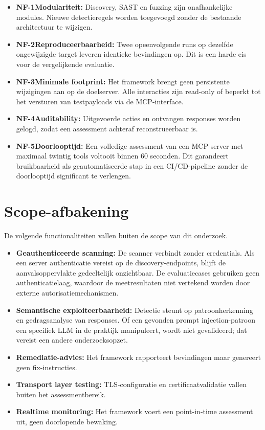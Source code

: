 \begin{itemize}
    \item \textbf{NF-1Modulariteit:} Discovery, SAST en fuzzing zijn onafhankelijke modules. Nieuwe detectieregels worden toegevoegd zonder de bestaande architectuur te wijzigen.
    \item \textbf{NF-2Reproduceerbaarheid:} Twee opeenvolgende runs op dezelfde ongewijzigde target leveren identieke bevindingen op. Dit is een harde eis voor de vergelijkende evaluatie.
    \item \textbf{NF-3Minimale footprint:} Het framework brengt geen persistente wijzigingen aan op de doelserver. Alle interacties zijn read-only of beperkt tot het versturen van testpayloads via de MCP-interface.
    \item \textbf{NF-4Auditability:} Uitgevoerde acties en ontvangen responses worden gelogd, zodat een assessment achteraf reconstrueerbaar is.
    \item \textbf{NF-5Doorlooptijd:} Een volledige assessment van een MCP-server met maximaal twintig tools voltooit binnen 60 seconden. Dit garandeert bruikbaarheid als geautomatiseerde stap in een CI/CD-pipeline zonder de doorlooptijd significant te verlengen.
\end{itemize}

\section{Scope-afbakening}

De volgende functionaliteiten vallen buiten de scope van dit onderzoek.

\begin{itemize}
    \item \textbf{Geauthenticeerde scanning:} De scanner verbindt zonder credentials. Als een server authenticatie vereist op de discovery-endpoints, blijft de aanvalsoppervlakte gedeeltelijk onzichtbaar. De evaluatiecases gebruiken geen authenticatielaag, waardoor de meetresultaten niet vertekend worden door externe autorisatiemechanismen.
    \item \textbf{Semantische exploiteerbaarheid:} Detectie steunt op patroonherkenning en gedragsanalyse van responses. Of een gevonden prompt injection-patroon een specifiek LLM in de praktijk manipuleert, wordt niet gevalideerd; dat vereist een andere onderzoeksopzet.
    \item \textbf{Remediatie-advies:} Het framework rapporteert bevindingen maar genereert geen fix-instructies.
    \item \textbf{Transport layer testing:} TLS-configuratie en certificaatvalidatie vallen buiten het assessmentbereik.
    \item \textbf{Realtime monitoring:} Het framework voert een point-in-time assessment uit, geen doorlopende bewaking.
\end{itemize}

